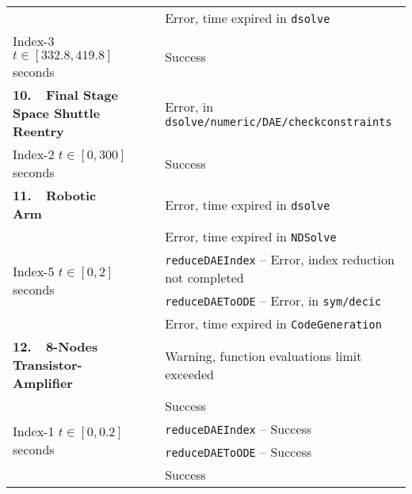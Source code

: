 {\begin{longtable}{lccl}
    & \Maple{}  & \mycrossmark{}\phantom{\mywarnmark{}} & Error, time expired in \texttt{dsolve} \\ \cmidrule{2-4}
    Index-3 \quad $t \in [332.8, 419.8]$ seconds & \Indigo{} & \mycheckmark{}\phantom{\mywarnmark{}} & Success \\ \midrule
  \multirow{1}{*}{\textbf{10.~~Final Stage Space Shuttle Reentry~\cite{brenan1995numerical}}}
    & \Maple{}  & \mycrossmark{}\phantom{\mywarnmark{}} & Error, in \texttt{dsolve/numeric/DAE/checkconstraints} \\ \cmidrule{2-4}
    Index-2 \quad $t \in [0, 300]$ seconds & \Indigo{} & \mycheckmark{}\phantom{\mywarnmark{}} & Success \\ \midrule
  \multirow{1}{*}{\textbf{11.~~Robotic Arm~\cite{pryce1998solving}}}
    & \Maple{}       & \mycrossmark{}\phantom{\mywarnmark{}} & Error, time expired in \texttt{dsolve} \\ \cmidrule{2-4}
    \multirow{4}{*}{Index-5 \quad $t \in [0, 2]$ seconds}
    & \Mathematica{} & \mycrossmark{}\phantom{\mywarnmark{}} & Error, time expired in \texttt{NDSolve} \\ \cmidrule{2-4}
    & \multirow{2}{*}{\Matlab{}} & \mycrossmark{}\phantom{\mywarnmark{}} & \texttt{reduceDAEIndex} -- Error, index reduction not completed \\ \cmidrule{3-4}
    &                            & \mycrossmark{}\phantom{\mywarnmark{}} & \texttt{reduceDAEToODE} -- Error, in \texttt{sym/decic} \\ \cmidrule{2-4}
    & \Indigo{} & \mycrossmark{}\phantom{\mywarnmark{}} & Error, time expired in \texttt{CodeGeneration} \\ \midrule
  \multirow{1}{*}{\textbf{12.~~8-Nodes Transistor-Amplifier~\cite{lioen1998test, mazzia2008test}}}
    & \Maple{}       & \mycheckmark{}\mywarnmark{} & Warning, function evaluations limit exceeded \\ \cmidrule{2-4}
    \multirow{4}{*}{Index-1 \quad $t \in [0, 0.2]$ seconds} & \Mathematica{} & \mycheckmark{}\phantom{\mywarnmark{}} & Success \\ \cmidrule{2-4}
    & \multirow{2}{*}{\Matlab{}} & \mycheckmark{}\phantom{\mywarnmark{}} & \texttt{reduceDAEIndex} -- Success \\ \cmidrule{3-4}
    &                            & \mycheckmark{}\phantom{\mywarnmark{}} & \texttt{reduceDAEToODE} -- Success \\ \cmidrule{2-4}\cmidrule{2-4}
    & \Indigo{} & \mycheckmark{}\phantom{\mywarnmark{}} & Success \\ \midrule

\end{longtable}}
